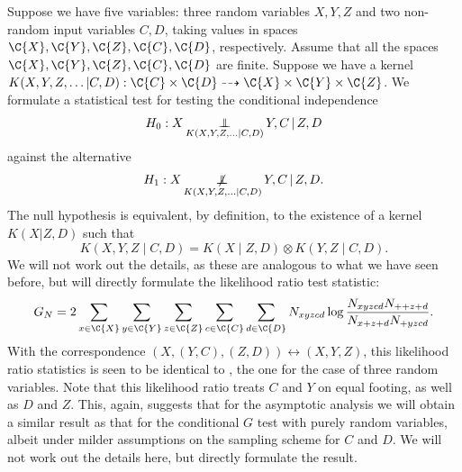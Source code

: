 Suppose we have five variables: three random variables $X,Y,Z$ and two 
non-random input variables $C,D$, taking values in spaces $\C{X}, \C{Y}, \C{Z}, \C{C}, \C{D}$, respectively. 
Assume that all the spaces $\C{X},\C{Y},\C{Z},\C{C},\C{D}$ are finite.
Suppose we have a kernel $K(X,Y,Z,\dots|C,D) : \C{C} \times \C{D} \dshto \C{X} \times \C{Y} \times \C{Z}$.
We formulate a statistical test for testing the conditional independence
$$H_0 : X \operatorname*{\perp\mkern-11mu\perp}_{K(X,Y,Z,\dots|C,D)} Y, C \operatorname*{|} Z, D$$
against the alternative
$$H_1 : X \operatorname*{\not\mkern-2mu\perp\mkern-11mu\perp}_{K(X,Y,Z,\dots|C,D)} Y, C \operatorname*{|} Z, D.$$
The null hypothesis is equivalent, by definition, to the existence of a kernel $K(X|Z,D)$ such that
$$K(X,Y,Z \mid C,D) = K(X \mid Z,D) \otimes K(Y,Z \mid C,D).$$
We will not work out the details, as these are analogous to what we have seen before, but will directly formulate
the likelihood ratio test statistic:
\begin{equation}\label{eq:general_G_test_statistic}
  G_N = 2 \sum_{x\in\C{X}}\sum_{y\in\C{Y}}\sum_{z\in\C{Z}}\sum_{c\in\C{C}}\sum_{d\in\C{D}}
  N_{xyzcd} \log \frac{N_{xyzcd} N_{++z+d}}{N_{x+z+d} N_{+yzcd}}.
\end{equation}
With the correspondence $(X,(Y,C),(Z,D)) \leftrightarrow (X,Y,Z)$, this likelihood
ratio statistics is seen to be identical to , the one for the case
of three random variables. Note that this likelihood ratio treats $C$ and $Y$ on equal footing, as
well as $D$ and $Z$.  This, again, suggests that for the asymptotic analysis we will obtain
a similar result as that for the conditional $G$ test with purely random variables, albeit under milder
assumptions on the sampling scheme for $C$ and $D$. We will not work out the details here, but directly
formulate the result.

